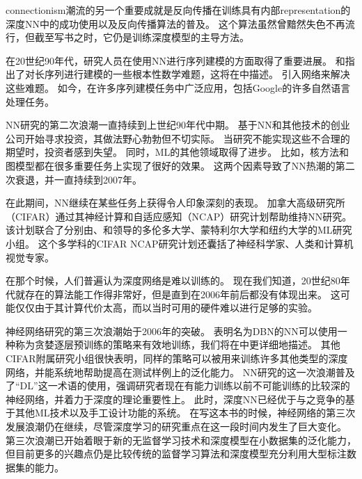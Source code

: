 
\gls{connectionism}潮流的另一个重要成就是反向传播在训练具有内部\gls{representation}的深度\gls{NN}中的成功使用以及反向传播算法的普及\citep{RHW,Lecun-these87}。
这个算法虽然曾黯然失色不再流行，但截至写书之时，它仍是训练深度模型的主导方法。%

在20世纪90年代，研究人员在使用\gls{NN}进行序列建模的方面取得了重要进展。
\citet{Hochreiter91}和\citet{Bengio1994ITNN}指出了对长序列进行建模的一些根本性数学难题，这将在中描述。
\citet{Hochreiter+Schmidhuber-1997}引入网络来解决这些难题。
如今，在许多序列建模任务中广泛应用，包括Google的许多自然语言处理任务。

\gls{NN}研究的第二次浪潮一直持续到上世纪90年代中期。
基于\gls{NN}和其他技术的创业公司开始寻求投资，其做法野心勃勃但不切实际。
当研究不能实现这些不合理的期望时，投资者感到失望。
同时，\gls{ML}的其他领域取得了进步。
比如，核方法\citep{Boser92,Cortes95,SchBurSmo99}和图模型\citep{Jordan98}都在很多重要任务上实现了很好的效果。
这两个因素导致了\gls{NN}热潮的第二次衰退，并一直持续到2007年。

在此期间，\gls{NN}继续在某些任务上获得令人印象深刻的表现\citep{LeCun98-small,Bengio-nnlm2001}。
加拿大高级研究所（CIFAR）通过其神经计算和自适应感知（NCAP）研究计划帮助维持\gls{NN}研究。
该计划联合了分别由、和领导的多伦多大学、蒙特利尔大学和纽约大学的\gls{ML}研究小组。
这个多学科的CIFAR NCAP研究计划还囊括了神经科学家、人类和计算机视觉专家。


在那个时候，人们普遍认为深度网络是难以训练的。
现在我们知道，20世纪80年代就存在的算法能工作得非常好，但是直到在2006年前后都没有体现出来。
这可能仅仅由于其计算代价太高，而以当时可用的硬件难以进行足够的实验。

神经网络研究的第三次浪潮始于2006年的突破。
表明名为\gls{DBN}的\gls{NN}可以使用一种称为贪婪逐层预训练的策略来有效地训练\citep{Hinton06}，我们将在中更详细地描述。
其他CIFAR附属研究小组很快表明，同样的策略可以被用来训练许多其他类型的深度网络\citep{Bengio+Lecun-chapter2007-small,ranzato-07}，并能系统地帮助提高在测试样例上的泛化能力。
\gls{NN}研究的这一次浪潮普及了``\gls{DL}''这一术语的使用，强调研究者现在有能力训练以前不可能训练的比较深的神经网络，并着力于深度的理论重要性上\citep{Bengio+Lecun-chapter2007,Delalleau+Bengio-2011-small,Pascanu-et-al-ICLR2014,Montufar-et-al-NIPS2014}。
此时，深度\gls{NN}已经优于与之竞争的基于其他\gls{ML}技术以及手工设计功能的系统。
在写这本书的时候，神经网络的第三次发展浪潮仍在继续，尽管深度学习的研究重点在这一段时间内发生了巨大变化。
第三次浪潮已开始着眼于新的无监督学习技术和深度模型在小数据集的泛化能力，但目前更多的兴趣点仍是比较传统的监督学习算法和深度模型充分利用大型标注数据集的能力。

